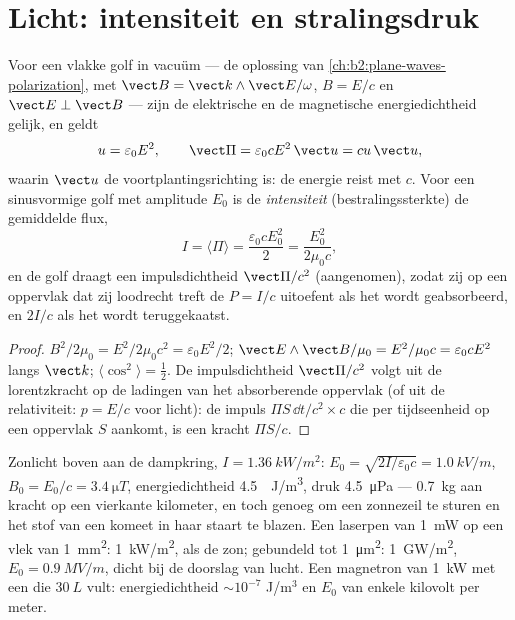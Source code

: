 \section{Licht: intensiteit en stralingsdruk}

\begin{proposition}\label{prop:b2:poynting-vector:wave}
Voor een vlakke golf in vacuüm --- de oplossing van
\cref{ch:b2:plane-waves-polarization}, met
$\vect B = \vect k\wedge\vect E/\omega$, $B = E/c$ en
$\vect E \perp \vect B$ --- zijn de elektrische en de magnetische
energiedichtheid gelijk, en geldt
\[
u = \varepsilon_0E^2 , \qquad \vect\Pi = \varepsilon_0cE^2\,\vect u = cu\,\vect u ,
\]
waarin $\vect u$ de voortplantingsrichting is: de energie reist met $c$.
Voor een sinusvormige golf met amplitude $E_0$ is de \emph{intensiteit}
(bestralingssterkte) de gemiddelde flux,
\[
I = \langle\Pi\rangle = \frac{\varepsilon_0cE_0^2}2 = \frac{E_0^2}{2\mu_0c} ,
\]
en de golf draagt een impulsdichtheid $\vect\Pi/c^2$ (aangenomen), zodat zij
op een oppervlak dat zij loodrecht treft de \emph{} $P = I/c$
uitoefent als het wordt geabsorbeerd, en $2I/c$ als het wordt teruggekaatst.
\end{proposition}

\begin{proof}
$B^2/2\mu_0 = E^2/2\mu_0c^2 = \varepsilon_0E^2/2$;
$\vect E\wedge\vect B/\mu_0 = E^2/\mu_0c =
\varepsilon_0cE^2$ langs
$\vect k$; $\langle\cos^2\rangle = \tfrac12$. De impulsdichtheid
$\vect\Pi/c^2$ volgt uit de lorentzkracht op de ladingen van het
absorberende oppervlak (of uit de relativiteit: $p = E/c$ voor licht): de
impuls $\Pi S\,\dd t/c^2\times c$ die per tijdseenheid op een oppervlak $S$
aankomt, is een kracht $\Pi S/c$.
\end{proof}

\begin{example}\label{ex:b2:poynting-vector:orders}
Zonlicht boven aan de dampkring, $I = \qty{1.36}{kW/m^2}$:
$E_0 =
\sqrt{2I/\varepsilon_0c} = \qty{1.0}{kV/m}$,
$B_0 = E_0/c = \qty{3.4}{\micro T}$, energiedichtheid \qty{4.5}{\micro
J/m^3}, druk \qty{4.5}{\micro Pa} --- \qty{0.7}{kg} aan kracht op een
vierkante kilometer, en toch genoeg om een zonnezeil te sturen en het stof
van een komeet in haar staart te blazen. Een laserpen van \qty{1}{mW} op een
vlek van \qty{1}{mm^2}: \qty{1}{kW/m^2}, als de zon; gebundeld tot
\qty{1}{\micro m^2}: \qty{1}{GW/m^2}, $E_0 = \qty{0.9}{MV/m}$, dicht bij de
doorslag van lucht. Een magnetron van \qty{1}{kW} met een  die
$\qty{30}{L}$ vult: energiedichtheid $\sim 10^{-7}$ J/m$^3$ en $E_0$ van
enkele kilovolt per meter.
\end{example}

